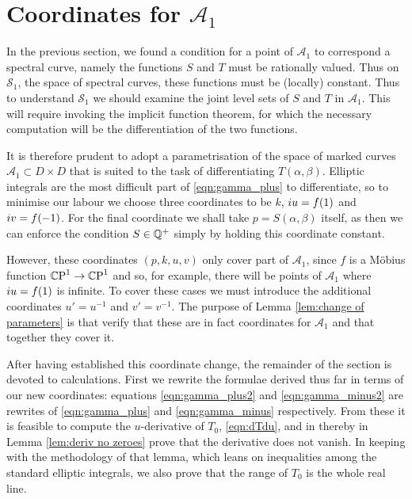 \section{Coordinates for \texorpdfstring{$\mathcal{A}_1$}{A1}}
\label{sec:Reformulate}

In the previous section, we found a condition for a point of $\mathcal{A}_1$ to correspond a spectral curve, namely the functions $S$ and $T$ must be rationally valued. Thus on $\mathcal{S}_1$, the space of spectral curves, these functions must be (locally) constant. Thus to understand $\mathcal{S}_1$ we should examine the joint level sets of $S$ and $T$ in $\mathcal{A}_1$. This will require invoking the implicit function theorem, for which the necessary computation will be the differentiation of the two functions.

It is therefore prudent to adopt a parametrisation of the space of marked curves $\mathcal{A}_1 \subset D\times D$ that is suited to the task of differentiating $T(α,β)$.
Elliptic integrals are the most difficult part of \eqref{eqn:gamma_plus} to differentiate, so to minimise our labour we choose three coordinates to be $k$, $i u = f(1)$ and $i v = f(-1)$. For the final coordinate we shall take $p=S(α,β)$ itself, as then we can enforce the condition $S\in\Q^+$ simply by holding this coordinate constant.

However, these coordinates $(p,k,u,v)$ only cover part of $\mathcal{A}_1$, since $f$ is a Möbius function $\CP^1 \to \CP^1$ and so, for example, there will be points of $\mathcal{A}_1$ where $i u = f(1)$ is infinite. To cover these cases we must introduce the additional coordinates $u' = u^{-1}$ and $v' = v^{-1}$. The purpose of Lemma \ref{lem:change of parameters} is that verify that these are in fact coordinates for $\mathcal{A}_1$ and that together they cover it.

After having established this coordinate change, the remainder of the section is devoted to calculations. First we rewrite the formulae derived thus far in terms of our new coordinates: equations \eqref{eqn:gamma_plus2} and \eqref{eqn:gamma_minus2} are rewrites of \eqref{eqn:gamma_plus} and \eqref{eqn:gamma_minus} respectively. From these it is feasible to compute the $u$-derivative of $T_0$, \eqref{eqn:dTdu}, and in thereby in Lemma \ref{lem:deriv no zeroes} prove that the derivative does not vanish. In keeping with the methodology of that lemma, which leans on inequalities among the standard elliptic integrals, we also prove that the range of $T_0$ is the whole real line.

